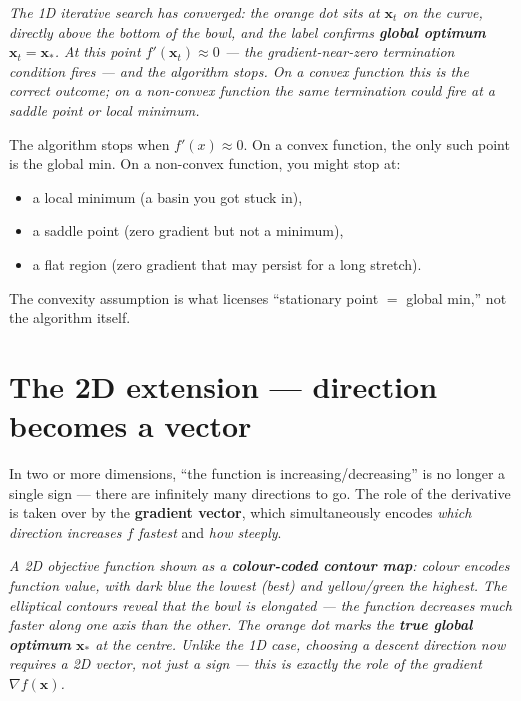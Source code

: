 \documentclass[11pt, a4paper]{article}
\begin{document}
\begin{center}

\footnotesize\textit{The 1D iterative search has converged: the orange dot sits at $\mathbf{x}_t$ on the curve, directly above the bottom of the bowl, and the label confirms \textbf{global optimum} $\mathbf{x}_t = \mathbf{x}_*$. At this point $f'(\mathbf{x}_t) \approx 0$ --- the gradient-near-zero termination condition fires --- and the algorithm stops. On a convex function this is the correct outcome; on a non-convex function the same termination could fire at a saddle point or local minimum.}
\end{center}

\begin{pitfallbox}
The algorithm stops when $f'(x) \approx 0$. On a convex function, the only such point is the global min. On a non-convex function, you might stop at:
\begin{itemize}
  \item a local minimum (a basin you got stuck in),
  \item a saddle point (zero gradient but not a minimum),
  \item a flat region (zero gradient that may persist for a long stretch).
\end{itemize}
The convexity assumption is what licenses ``stationary point $=$ global min,'' not the algorithm itself.
\end{pitfallbox}

\section{The 2D extension — direction becomes a vector}

In two or more dimensions, ``the function is increasing/decreasing'' is no longer a single sign — there are infinitely many directions to go. The role of the derivative is taken over by the \textbf{gradient vector}, which simultaneously encodes \emph{which direction increases $f$ fastest} and \emph{how steeply}.

\begin{center}

\footnotesize\textit{A 2D objective function shown as a \textbf{colour-coded contour map}: colour encodes function value, with dark blue the lowest (best) and yellow/green the highest. The elliptical contours reveal that the bowl is elongated --- the function decreases much faster along one axis than the other. The orange dot marks the \textbf{true global optimum} $\mathbf{x}_*$ at the centre. Unlike the 1D case, choosing a descent direction now requires a 2D vector, not just a sign --- this is exactly the role of the gradient $\nabla f(\mathbf{x})$.}
\end{center}
\end{document}

